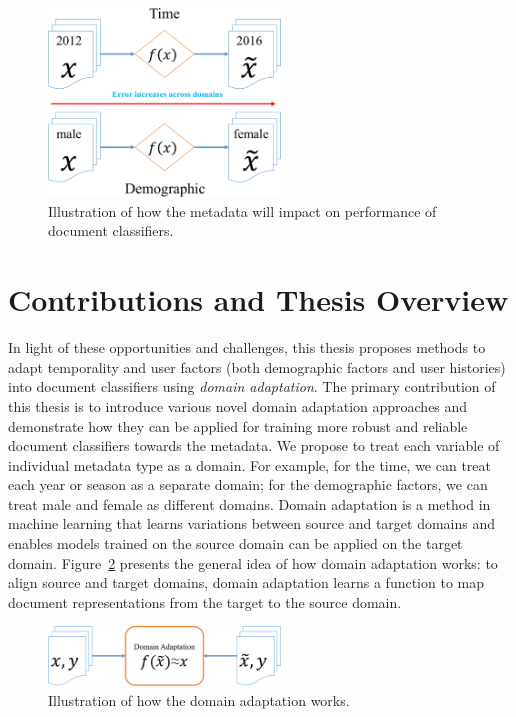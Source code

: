 \begin{figure}[tb!]
\centering
\includegraphics[width=0.55\textwidth]{images/chapter1/metadata_impact.pdf}
\caption{Illustration of how the metadata will impact on performance of document classifiers.}
\label{chap1:fig:impact}
\end{figure}


\section{Contributions and Thesis Overview}

In light of these opportunities and challenges, this thesis proposes methods to adapt temporality and user factors (both demographic factors and user histories) into document classifiers using \textit{domain adaptation}.
The primary contribution of this thesis is to introduce various novel domain adaptation approaches and demonstrate how they can be applied for training more robust and reliable document classifiers towards the metadata.
We propose to treat each variable of individual metadata type as a domain. For example, for the time, we can treat each year or season as a separate domain; for the demographic factors, we can treat male and female as different domains. 
Domain adaptation is a method in machine learning that learns variations between source and target domains and enables models trained on the source domain can be applied on the target domain. 
Figure~\ref{chap1:fig:da} presents the general idea of how domain adaptation works: to align source and target domains, domain adaptation learns a function to map document representations from the target to the source domain.


\begin{figure}[b!]
\centering
\includegraphics[width=0.55\textwidth]{images/chapter1/da_illu.pdf}
\caption{Illustration of how the domain adaptation works.}
\label{chap1:fig:da}
\end{figure}

